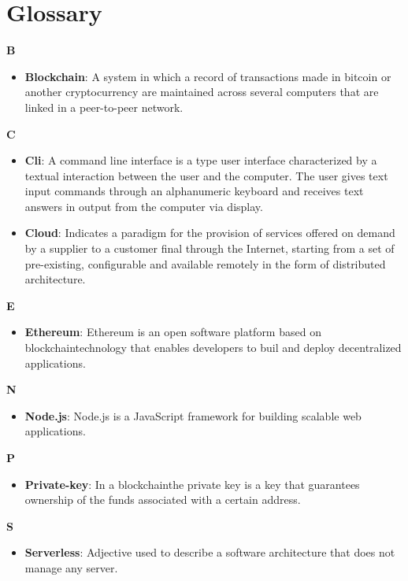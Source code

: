 \section{Glossary}
\textbf{B}
\begin{itemize}
	\item \textbf{Blockchain}: A system in which a record of transactions made in bitcoin or another cryptocurrency are maintained across several computers that are linked in a peer-to-peer network.
\end{itemize}
\textbf{C}
\begin{itemize}
	\item \textbf{Cli}: A command line interface is a type user interface characterized by a textual interaction between the user and the computer. The user gives text input commands through an alphanumeric keyboard and receives text answers in output from the computer via display.
	\item \textbf{Cloud}: Indicates a paradigm for the provision of services offered on demand by a supplier to a customer
	final through the Internet, starting from a set of pre-existing, configurable and
	available remotely in the form of distributed architecture.
\end{itemize}
\textbf{E}
\begin{itemize}
	\item \textbf{Ethereum}: Ethereum is an open software platform based on blockchain\glo technology that enables developers to buil and deploy decentralized applications.
\end{itemize}
\textbf{N}
\begin{itemize}
	\item \textbf{Node.js}: Node.js is a JavaScript framework for building scalable web applications.
\end{itemize}
\textbf{P}
\begin{itemize}
	\item \textbf{Private-key}: In a blockchain\glo the private key is a key that guarantees ownership of the funds associated with
	a certain address.
\end{itemize}
\textbf{S}
\begin{itemize}
	\item \textbf{Serverless}: Adjective used to describe a software architecture that does not manage any server.
\end{itemize}

